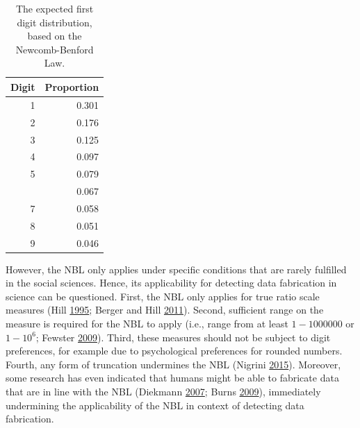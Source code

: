 \documentclass[a5paper]{book}
\begin{document}
\begin{table}[!h]

\caption{\label{tab:nbl}The expected first digit distribution, based on the Newcomb-Benford Law.}
\centering
\begin{tabular}{rr}
\toprule
Digit & Proportion\\
\midrule
\rowcolor{gray!6}  1 & 0.301\\
2 & 0.176\\
\rowcolor{gray!6}  3 & 0.125\\
4 & 0.097\\
\rowcolor{gray!6}  5 & 0.079\\
\addlinespace
6 & 0.067\\
\rowcolor{gray!6}  7 & 0.058\\
8 & 0.051\\
\rowcolor{gray!6}  9 & 0.046\\
\bottomrule
\end{tabular}
\end{table}

However, the NBL only applies under specific conditions that are rarely
fulfilled in the social sciences. Hence, its applicability for detecting
data fabrication in science can be questioned. First, the NBL only
applies for true ratio scale measures (Hill
\protect\hyperlink{ref-doi:10.2307ux2f2246134}{1995}; Berger and Hill
\protect\hyperlink{ref-doi:10.1214ux2f11-ps175}{2011}). Second,
sufficient range on the measure is required for the NBL to apply (i.e.,
range from at least \(1-1000000\) or \(1-10^6\); Fewster
\protect\hyperlink{ref-doi:10.1198ux2ftast.2009.0005}{2009}). Third,
these measures should not be subject to digit preferences, for example
due to psychological preferences for rounded numbers. Fourth, any form
of truncation undermines the NBL (Nigrini
\protect\hyperlink{ref-doi:10.1515ux2f9781400866595-011}{2015}).
Moreover, some research has even indicated that humans might be able to
fabricate data that are in line with the NBL (Diekmann
\protect\hyperlink{ref-doi:10.1080ux2f02664760601004940}{2007}; Burns
\protect\hyperlink{ref-Burns2009}{2009}), immediately undermining the
applicability of the NBL in context of detecting data fabrication.
\end{document}
